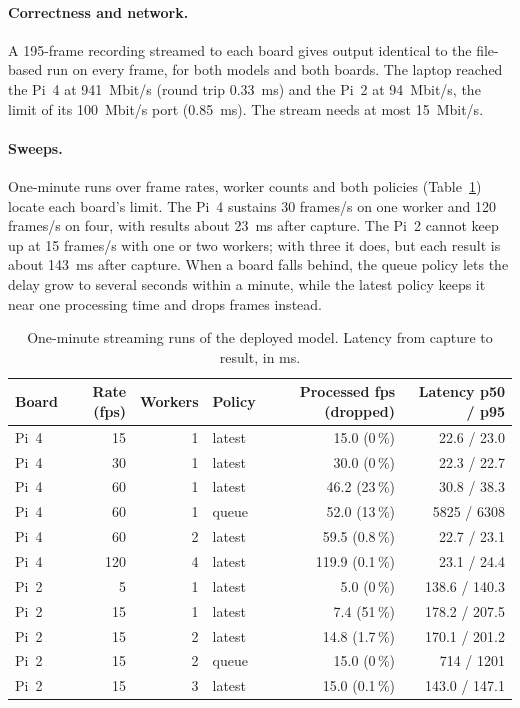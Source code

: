 \documentclass[11pt,a4paper]{article}
\begin{document}
\paragraph{Correctness and network.} A 195-frame recording streamed to
each board gives output identical to the file-based run on every frame,
for both models and both boards. The laptop reached the Pi~4 at
941~Mbit/s (round trip 0.33~ms) and the Pi~2 at 94~Mbit/s, the limit of
its 100~Mbit/s port (0.85~ms). The stream needs at most 15~Mbit/s.

\paragraph{Sweeps.} One-minute runs over frame rates, worker counts and
both policies (Table~\ref{tab:sweep}) locate each board's limit. The Pi~4
sustains 30 frames/s on one worker and 120 frames/s on four, with results
about 23~ms after capture. The Pi~2 cannot keep up at 15 frames/s with one
or two workers; with three it does, but each result is about 143~ms after
capture. When a board falls behind, the queue policy lets the delay grow
to several seconds within a minute, while the latest policy keeps it near
one processing time and drops frames instead.

\begin{table}[H]
\centering
\caption{One-minute streaming runs of the deployed model. Latency from
capture to result, in ms.}
\label{tab:sweep}
\begin{tabular}{lrrlrr}
\toprule
Board & Rate (fps) & Workers & Policy & Processed fps (dropped) & Latency p50 / p95 \\
\midrule
Pi~4 & 15 & 1 & latest & 15.0 (0\,\%) & 22.6 / 23.0 \\
Pi~4 & 30 & 1 & latest & 30.0 (0\,\%) & 22.3 / 22.7 \\
Pi~4 & 60 & 1 & latest & 46.2 (23\,\%) & 30.8 / 38.3 \\
Pi~4 & 60 & 1 & queue & 52.0 (13\,\%) & 5825 / 6308 \\
Pi~4 & 60 & 2 & latest & 59.5 (0.8\,\%) & 22.7 / 23.1 \\
Pi~4 & 120 & 4 & latest & 119.9 (0.1\,\%) & 23.1 / 24.4 \\
\midrule
Pi~2 & 5 & 1 & latest & 5.0 (0\,\%) & 138.6 / 140.3 \\
Pi~2 & 15 & 1 & latest & 7.4 (51\,\%) & 178.2 / 207.5 \\
Pi~2 & 15 & 2 & latest & 14.8 (1.7\,\%) & 170.1 / 201.2 \\
Pi~2 & 15 & 2 & queue & 15.0 (0\,\%) & 714 / 1201 \\
Pi~2 & 15 & 3 & latest & 15.0 (0.1\,\%) & 143.0 / 147.1 \\
\bottomrule
\end{tabular}
\end{table}
\end{document}
